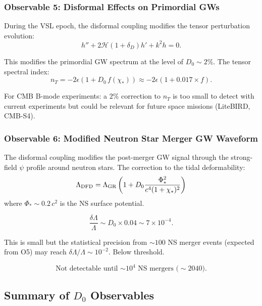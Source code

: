 \documentclass[11pt,a4paper]{article}
\begin{document}
\subsubsection{Observable 5: Disformal Effects on Primordial GWs}

During the VSL epoch, the disformal coupling modifies the tensor perturbation evolution:
\begin{equation}
h'' + 2\mathcal{H}(1+\delta_D)h' + k^2 h = 0.
\end{equation}

This modifies the primordial GW spectrum at the level of $D_0 \sim 2\%$. The tensor spectral index:
\begin{equation}
n_T = -2\epsilon(1 + D_0\,f(\chi_*)) \approx -2\epsilon(1 + 0.017 \times f).
\end{equation}

For CMB B-mode experiments: a $2\%$ correction to $n_T$ is too small to detect with current experiments but could be relevant for future space missions (LiteBIRD, CMB-S4).

\subsubsection{Observable 6: Modified Neutron Star Merger GW Waveform}

The disformal coupling modifies the post-merger GW signal through the strong-field $\psi$ profile around neutron stars. The correction to the tidal deformability:
\begin{equation}
\Lambda_{\rm DFD} = \Lambda_{\rm GR}\left(1 + D_0\frac{\Phi_*^2}{c^4(1+\chi_*)^2}\right)
\end{equation}
where $\Phi_* \sim 0.2\,c^2$ is the NS surface potential.

\begin{equation}
\frac{\delta\Lambda}{\Lambda} \sim D_0 \times 0.04 \sim 7 \times 10^{-4}.
\end{equation}

This is small but the statistical precision from $\sim 100$ NS merger events (expected from O5) may reach $\delta\Lambda/\Lambda \sim 10^{-2}$. Below threshold.

\begin{equation}
\boxed{\text{Not detectable until $\sim 10^4$ NS mergers ($\sim$2040).}}
\end{equation}

\subsection{Summary of $D_0$ Observables}
\end{document}
